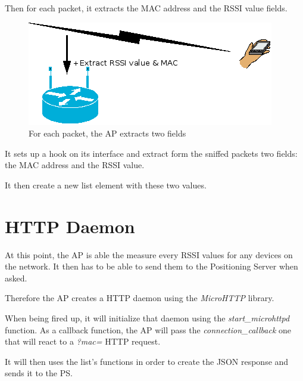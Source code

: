 Then for each packet, it extracts the MAC address and the RSSI value fields.

\begin{figure}[h]
  \centering
  \includegraphics[scale=.7]{./ap/focus_mobile_with_aps.png}
  \caption{For each packet, the AP extracts two fields}
\end{figure}

It sets up a
hook on its interface and extract form the sniffed packets two fields: the MAC
address and the RSSI value.

It then create a new list element with these two values.

\section{HTTP Daemon}

At this point, the AP is able the measure every RSSI values for any devices on
the network. It then has to be able to send them to the Positioning Server when
asked.

Therefore the AP creates a HTTP daemon using the \emph{MicroHTTP} library.

When being fired up, it will initialize that daemon using the
\emph{start\_microhttpd} function. As a callback function, the AP will pass the
\emph{connection\_callback} one that will react to a \emph{?mac=} HTTP request.

It will then uses the list's functions in order to create the JSON response and
sends it to the PS.
